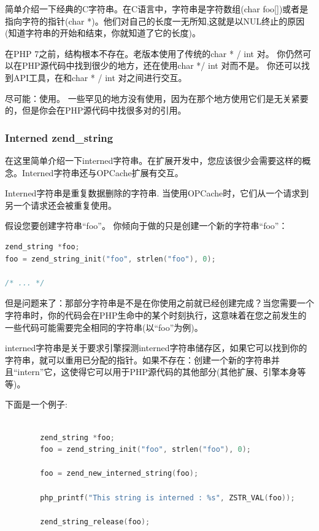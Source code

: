 简单介绍一下经典的C字符串。在C语言中，字符串是字符数组(char foo[])或者是指向字符的指针(char *)。他们对自己的长度一无所知,这就是以NUL终止的原因(知道字符串的开始和结束，你就知道了它的长度)。

在PHP 7之前，结构根本不存在。老版本使用了传统的char * / int 对。 你仍然可以在PHP源代码中找到很少的地方，还在使用char */ int 对而不是。 你还可以找到API工具，在和char * / int 对之间进行交互。

尽可能：使用。 一些罕见的地方没有使用，因为在那个地方使用它们是无关紧要的，但是你会在PHP源代码中找很多对的引用。

\subsubsection{Interned zend\_string}

在这里简单介绍一下interned字符串。在扩展开发中，您应该很少会需要这样的概念。Interned字符串还与OPCache扩展有交互。

Interned字符串是重复数据删除的字符串. 当使用OPCache时，它们从一个请求到另一个请求还会被重复使用。

假设您要创建字符串“foo”。 你倾向于做的只是创建一个新的字符串“foo”：

\begin{lstlisting}[language=c]
zend_string *foo;
foo = zend_string_init("foo", strlen("foo"), 0);

/* ... */
\end{lstlisting} 

但是问题来了：那部分字符串是不是在你使用之前就已经创建完成？当您需要一个字符串时，你的代码会在PHP生命中的某个时刻执行，这意味着在您之前发生的一些代码可能需要完全相同的字符串(以“foo”为例)。

interned字符串是关于要求引擎探测interned字符串储存区，如果它可以找到你的字符串，就可以重用已分配的指针。如果不存在：创建一个新的字符串并且“intern”它，这使得它可以用于PHP源代码的其他部分(其他扩展、引擎本身等等)。


下面是一个例子:

\begin{lstlisting}[language=c]

        zend_string *foo;
        foo = zend_string_init("foo", strlen("foo"), 0);

        foo = zend_new_interned_string(foo);

        php_printf("This string is interned : %s", ZSTR_VAL(foo));

        zend_string_release(foo);
        
\end{lstlisting}


